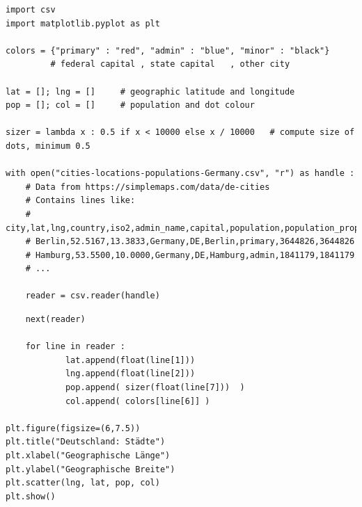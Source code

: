 \begin{frame}[fragile]
%
\begin{codebox}
\begin{verbatim}
import csv
import matplotlib.pyplot as plt

colors = {"primary" : "red", "admin" : "blue", "minor" : "black"}
         # federal capital , state capital   , other city

lat = []; lng = []     # geographic latitude and longitude
pop = []; col = []     # population and dot colour

sizer = lambda x : 0.5 if x < 10000 else x / 10000   # compute size of dots, minimum 0.5

with open("cities-locations-populations-Germany.csv", "r") as handle :
    # Data from https://simplemaps.com/data/de-cities
    # Contains lines like:
    # city,lat,lng,country,iso2,admin_name,capital,population,population_proper
    # Berlin,52.5167,13.3833,Germany,DE,Berlin,primary,3644826,3644826
    # Hamburg,53.5500,10.0000,Germany,DE,Hamburg,admin,1841179,1841179
    # ...
    
    reader = csv.reader(handle)
\end{verbatim}
\end{codebox}
%
\end{frame}


\begin{frame}[fragile]
%
\begin{codebox}[... continued]
\begin{verbatim}
    next(reader)
    
    for line in reader :
            lat.append(float(line[1]))
            lng.append(float(line[2]))
            pop.append( sizer(float(line[7]))  )
            col.append( colors[line[6]] )

plt.figure(figsize=(6,7.5))
plt.title("Deutschland: Städte")
plt.xlabel("Geographische Länge")
plt.ylabel("Geographische Breite")
plt.scatter(lng, lat, pop, col)
plt.show()
\end{verbatim}
\end{codebox}
%
\end{frame}


